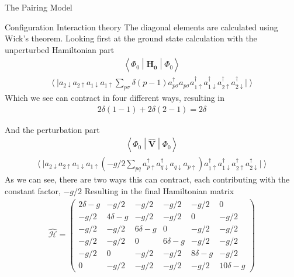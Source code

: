 \documentclass[twoside,english]{uiofysmaster}
\begin{document}
\begin{chapter}{The Pairing Model}
\begin{section}{Configuration Interaction theory}
		The diagonal elements are calculated using Wick's theorem. Looking first at the ground state calculation with the unperturbed Hamiltonian part
		\begin{align}
			\left< \Phi_0 \middle| \hat{\mathbf{H_0}} \middle| \Phi_0 \right> 
		\end{align}
		\begin{align}
			\left< \right|  a_{2 \downarrow}  a_{2 \uparrow} a_{1 \downarrow} a_{1 \uparrow} \sum_{p \sigma} \delta (p-1) a_{p \sigma}^{\dagger} a_{p \sigma} 
			a_{1 \uparrow}^{\dagger} a_{1 \downarrow}^{\dagger} a_{2 \uparrow}^{\dagger} a_{2 \downarrow}^{\dagger} \left| \right> 
		\end{align}
		Which we see can contract in four different ways, resulting in 
		\begin{align}
			2 \delta (1-1) + 2 \delta (2-1) = 2 \delta
		\end{align}

		And the perturbation part
		\begin{align}
			\left< \Phi_0 \middle| \hat{\mathbf{V}} \middle| \Phi_0 \right>
		\end{align}
		\begin{align}
			\left< \right| a_{2 \downarrow}  a_{2 \uparrow} a_{1 \downarrow} a_{1 \uparrow} \left( -g / 2 \sum_{pq} a_{p \uparrow}^{\dagger} a_{q \downarrow}^{\dagger} a_{q \downarrow} a_{p \uparrow} \right) 
			a_{1 \uparrow}^{\dagger} a_{1 \downarrow}^{\dagger} a_{2 \uparrow}^{\dagger} a_{2 \downarrow}^{\dagger} \left| \right> 
		\end{align}
		As we can see, there are two ways this can contract, each contributing with the constant factor, $-g / 2$
		Resulting in the final Hamiltonian matrix 
		\begin{align}
			\hat{\mathcal{H}} = \left( \begin{matrix}
				2 \delta - g & -g / 2 & -g / 2 & -g / 2 & -g / 2 & 0  \\
				-g / 2 & 4 \delta - g & -g / 2 & -g / 2 & 0 & -g / 2  \\
				-g / 2 & -g / 2 & 6 \delta - g & 0 & -g / 2 & -g / 2 \\
				-g / 2 & -g / 2 & 0 & 6 \delta - g & -g / 2 & -g / 2 \\
				-g / 2 & 0 & -g / 2 & -g / 2 & 8 \delta - g & -g / 2 \\
				0 & -g / 2 & -g / 2 & -g / 2 & -g / 2 & 10 \delta - g 
			\end{matrix} \right)
		\end{align}


\end{section}
\end{chapter}
\end{document}
